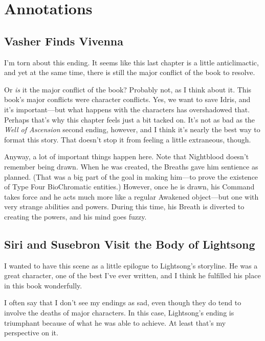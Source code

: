 \section*{Annotations}

\subsection*{Vasher Finds Vivenna}

I’m torn about this ending. It seems like this last chapter is a little anticlimactic, and yet at the same time, there is still the major conflict of the book to resolve.

Or \textit{is} it the major conflict of the book? Probably not, as I think about it. This book’s major conflicts were character conflicts. Yes, we want to save Idris, and it’s important—but what happens with the characters has overshadowed that. Perhaps that’s why this chapter feels just a bit tacked on. It’s not as bad as the \textit{Well of Ascension} second ending, however, and I think it’s nearly the best way to format this story. That doesn’t stop it from feeling a little extraneous, though.

Anyway, a lot of important things happen here. Note that Nightblood doesn’t remember being drawn. When he was created, the Breaths gave him sentience as planned. (That was a big part of the goal in making him—to prove the existence of Type Four BioChromatic entities.) However, once he is drawn, his Command takes force and he acts much more like a regular Awakened object—but one with very strange abilities and powers. During this time, his Breath is diverted to creating the powers, and his mind goes fuzzy.

\subsection*{Siri and Susebron Visit the Body of Lightsong}

I wanted to have this scene as a little epilogue to Lightsong’s storyline. He was a great character, one of the best I’ve ever written, and I think he fulfilled his place in this book wonderfully.

I often say that I don’t see my endings as sad, even though they do tend to involve the deaths of major characters. In this case, Lightsong’s ending is triumphant because of what he was able to achieve. At least that’s my perspective on it.

